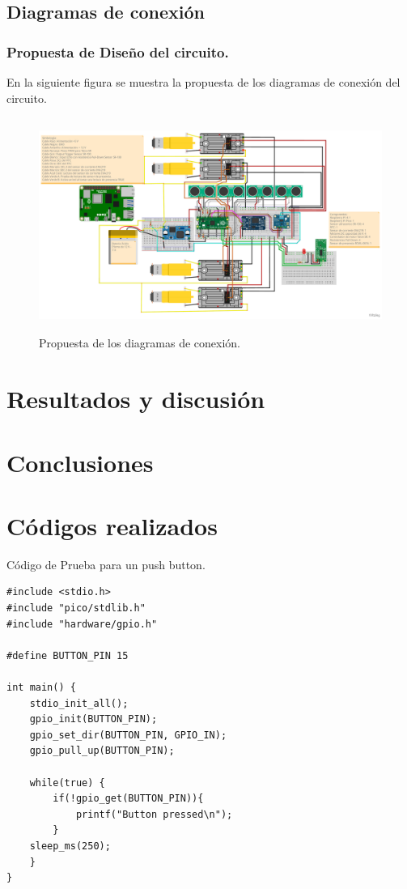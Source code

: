 \documentclass[12pt]{book} %
\begin{document}
 \section{Diagramas de conexión}
	 \subsection{Propuesta de Diseño del circuito.}
	 En la siguiente figura se muestra la propuesta de los diagramas de conexión del circuito.
	\begin{figure}[H]
	\begin{center}
	\includegraphics[width =16cm,height =7cm]{Ayudame_Control.pdf}
	\caption{Propuesta de los diagramas de conexión.} 
	\end{center}
	\end{figure}
 
\chapter{Resultados y discusión}
  \lhead[]{}



\chapter{Conclusiones}
  \lhead[]{} 


\chapter{Códigos realizados}
  \lhead[]{} 
  
Código de Prueba para un push button.  
\begin{lstlisting}
#include <stdio.h>
#include "pico/stdlib.h"
#include "hardware/gpio.h"

#define BUTTON_PIN 15

int main() {
	stdio_init_all();
	gpio_init(BUTTON_PIN);
	gpio_set_dir(BUTTON_PIN, GPIO_IN);
	gpio_pull_up(BUTTON_PIN);

	while(true) {
		if(!gpio_get(BUTTON_PIN)){
			printf("Button pressed\n");
		}
	sleep_ms(250);
	}
}
\end{lstlisting}
\end{document}
